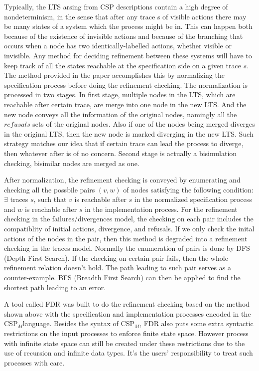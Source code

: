 \documentclass{llncs}
\newcommand{\cspm}{CSP$_M$}
\begin{document}
Typically, the LTS arsing from CSP descriptions contain a high degree of
nondeterminism, in the sense that after any trace s of visible actions there may
be many states of a system which the process might be in. This can happen both
because of the existence of invisible actions and because of the branching that
occurs when a node has two identically-labelled actions, whether visible or
invisible. Any method for deciding refinement between these systems will have
to keep track of all the states reachable at the specification side on a given
trace $s$. The method provided in the paper accomplishes this by normalizing the
specification process before doing the refinement checking. The normalization
is processed in two stages. In first stage, multiple nodes in the LTS, which 
are reachable after certain trace, are merge into one node in the new LTS. And
the new node conveys all the information of the original nodes, namingly all the
$refusals$ sets of the original nodes. Also if one of the nodes being merged
diverges in the original LTS, then the new node is marked diverging in the new
LTS. Such strategy matches our idea that if certain trace can lead the process
to diverge, then whatever after is of no concern. Second stage is actually a
bisimulation checking, bisimilar nodes are merged as one.

After normalization, the refinement checking is conveyed by enumerating and
checking all the
possbile pairs $(v, w)$ of nodes satisfying the following condition: $\exists$
traces $s$, such that $v$ is reachable after $s$ in
the normalized specification process and $w$ is reachable after $s$ in
the implementation process. For the refinement checking in the
failures/divergences model, the checking on each pair includes the compatiblity
of initial actions, divergence, and refusals. If we only check the inital
actions of the nodes in the pair, then this method is degraded into a refinement
checking in the traces model. Normally the enumeration of pairs is done by DFS
(Depth First Search). If the checking on certain pair fails, then the whole
refinement relation doesn't hold. The path leading to such pair serves as a
counter-example. BFS (Breadth First Search) can then be applied to find the
shortest path leading to an error.

A tool called FDR was built to do the refinement checking based on the method
shown above with the specification and implementation processes encoded in
the \cspm language. Besides the syntax of \cspm, FDR also puts some extra 
syntactic restrictions on the input processes to enforce finite state space.
However process with infinite state space can still be created under these
restrictions due to the use of recursion and infinite data types. It's the
users' responsibility to treat such processes with care.
\end{document}
